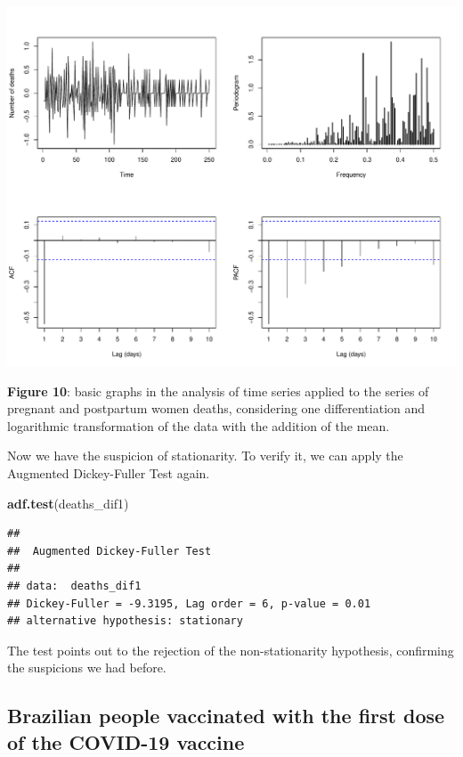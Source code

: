 \documentclass[
]{article}
\newenvironment{Shaded}{\begin{snugshade}}{\end{snugshade}}
\newcommand{\FunctionTok}[1]{\textcolor[rgb]{0.13,0.29,0.53}{\textbf{#1}}}
\newcommand{\NormalTok}[1]{#1}
\renewenvironment{Shaded}{\begin{mdframed}[ backgroundcolor=shadecolor, linecolor = shadecolor, leftmargin=\dimexpr\leftmargin-2pt\relax, innerleftmargin=1.6pt, innertopmargin=5pt, skipabove=10pt,skipbelow=3pt ]}{\end{mdframed}}
\begin{document}
\begin{center}\includegraphics[width=\linewidth]{IF_results_ENG_files/figure-latex/unnamed-chunk-10-1} \end{center}

\textbf{Figure 10}: basic graphs in the analysis of time series applied
to the series of pregnant and postpartum women deaths, considering one
differentiation and logarithmic transformation of the data with the
addition of the mean.

Now we have the suspicion of stationarity. To verify it, we can apply
the Augmented Dickey-Fuller Test again.

\begin{Shaded}
\begin{Highlighting}[]
\FunctionTok{adf.test}\NormalTok{(deaths\_dif1)}
\end{Highlighting}
\end{Shaded}

\begin{verbatim}
## 
##  Augmented Dickey-Fuller Test
## 
## data:  deaths_dif1
## Dickey-Fuller = -9.3195, Lag order = 6, p-value = 0.01
## alternative hypothesis: stationary
\end{verbatim}

The test points out to the rejection of the non-stationarity hypothesis,
confirming the suspicions we had before.

\subsection{Brazilian people vaccinated with the first dose of the
COVID-19
vaccine}\label{brazilian-people-vaccinated-with-the-first-dose-of-the-covid-19-vaccine}
\end{document}
